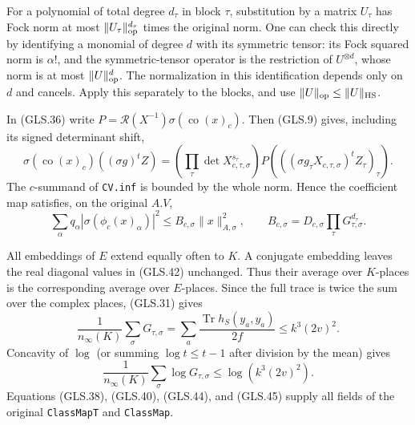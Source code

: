 For a polynomial of total degree $d_\tau$ in block $\tau$,
substitution by a matrix $U_\tau$ has Fock norm at most
$\|U_\tau\|_{\rm op}^{d_\tau}$ times the original norm.
One can check this directly by identifying a monomial of degree $d$
with its symmetric tensor: its Fock squared norm is $\alpha!$,
and the symmetric-tensor operator is the restriction of
$U^{\otimes d}$, whose norm is at most $\|U\|_{\rm op}^d$.
The normalization in this identification depends only on $d$ and
cancels.  Apply this separately to the blocks, and use
$\|U\|_{\rm op}\le\|U\|_{\rm HS}$.

In (GLS.36) write
$P=\mathcal R(X^{-1})\sigma(\operatorname{co}(x)_c)$.
Then (GLS.9) gives, including its signed determinant shift,
\[
 \sigma(\operatorname{co}(x)_c)((\sigma g)^tZ)
     =\left(\prod_\tau\det X_{c,\tau,\sigma}^{s_\tau}\right)
                     P(((\sigma g_\tau X_{c,\tau,\sigma})^tZ_\tau)_\tau).
\]
The $c$-summand of \texttt{CV.inf} is bounded by the whole norm.
Hence the coefficient map satisfies, on the original $A.V$,
\[
 \sum_\alpha q_\alpha|\sigma(\phi_c(x)_\alpha)|^2
 \le B_{c,\sigma}\|x\|_{A,\sigma}^2,
 \qquad B_{c,\sigma}=D_{c,\sigma}
                                \prod_\tau G_{\tau,\sigma}^{d_\tau}.
 \tag{GLS.44}
\]

All embeddings of $E$ extend equally often to $K$.  A conjugate
embedding leaves the real diagonal values in (GLS.42) unchanged.
Thus their average over $K$-places is the corresponding average
over $E$-places.  Since the full trace is twice the sum over the
complex places, (GLS.31) gives
\[
 \frac1{n_\infty(K)}\sum_\sigma G_{\tau,\sigma}
      =\sum_a\frac{\operatorname{Tr}h_S(y_a,y_a)}{2f}
      \le k^3(2v)^2.
\]
Concavity of $\log$ (or summing $\log t\le t-1$ after division
by the mean) gives
\[
 \frac1{n_\infty(K)}\sum_\sigma\log G_{\tau,\sigma}
                             \le\log(k^3(2v)^2).
 \tag{GLS.45}
\]
Equations (GLS.38), (GLS.40), (GLS.44), and (GLS.45) supply all
fields of the original \texttt{ClassMapT} and \texttt{ClassMap}.

